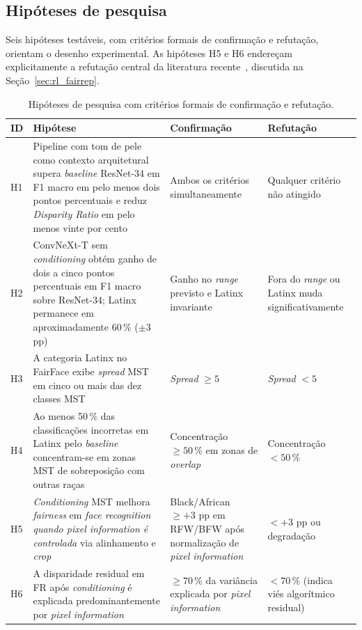 \subsection{Hipóteses de pesquisa}
\label{sec:hipoteses}

Seis hipóteses testáveis, com critérios formais de confirmação e refutação, orientam o desenho experimental. As hipóteses H5 e H6 endereçam explicitamente a refutação central da literatura recente~\cite{pangelinan2023exploring}, discutida na Seção~\ref{sec:rl_fairrep}.

\begin{table}[htbp]
\centering
\small
\begin{tabular}{p{0.5cm}p{5.5cm}p{4cm}p{4cm}}
\toprule
\textbf{ID} & \textbf{Hipótese} & \textbf{Confirmação} & \textbf{Refutação} \\
\midrule
H1 & Pipeline com tom de pele como contexto arquitetural supera \emph{baseline} ResNet-34 em F1 macro em pelo menos dois pontos percentuais e reduz \emph{Disparity Ratio} em pelo menos vinte por cento & Ambos os critérios simultaneamente & Qualquer critério não atingido \\
H2 & ConvNeXt-T sem \emph{conditioning} obtém ganho de dois a cinco pontos percentuais em F1 macro sobre ResNet-34; Latinx permanece em aproximadamente 60\,\% ($\pm$3 pp) & Ganho no \emph{range} previsto e Latinx invariante & Fora do \emph{range} ou Latinx muda significativamente \\
H3 & A categoria Latinx no FairFace exibe \emph{spread} MST em cinco ou mais das dez classes MST & \emph{Spread} $\geq 5$ & \emph{Spread} $< 5$ \\
H4 & Ao menos 50\,\% das classificações incorretas em Latinx pelo \emph{baseline} concentram-se em zonas MST de sobreposição com outras raças & Concentração $\geq 50\,\%$ em zonas de \emph{overlap} & Concentração $< 50\,\%$ \\
H5 & \emph{Conditioning} MST melhora \emph{fairness} em \emph{face recognition} \emph{quando pixel information é controlada} via alinhamento e \emph{crop} & Black/African $\geq +3$ pp em RFW/BFW após normalização de \emph{pixel information} & $< +3$ pp ou degradação \\
H6 & A disparidade residual em FR após \emph{conditioning} é explicada predominantemente por \emph{pixel information} & $\geq 70\,\%$ da variância explicada por \emph{pixel information} & $< 70\,\%$ (indica viés algorítmico residual) \\
\bottomrule
\end{tabular}
\caption{Hipóteses de pesquisa com critérios formais de confirmação e refutação.}
\label{tab:hipoteses}
\end{table}

